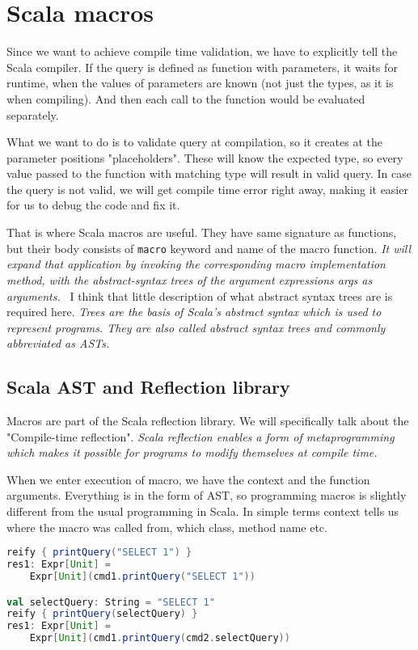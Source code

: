 \section{Scala macros}
Since we want to achieve compile time validation, we have to explicitly tell the Scala compiler. If the query is defined as function with parameters, it waits for runtime, when the values of parameters are known (not just the types, as it is when compiling). And then each call to the function would be evaluated separately.

What we want to do is to validate query at compilation, so it creates at the parameter positions "placeholders". These will know the expected type, so every value passed to the function with matching type will result in valid query. In case the query is not valid, we will get compile time error right away, making it easier for us to debug the code and fix it.

That is where Scala macros are useful. They have same signature as functions, but their body consists of \texttt{macro} keyword and name of the macro function.  \textit{It will expand that application by invoking the corresponding macro implementation method, with the abstract-syntax trees of the argument expressions args as arguments.}~\cite{Def macros} I think that little description of what abstract syntax trees are is required here. \textit{Trees are the basis of Scala’s abstract syntax which is used to represent programs. They are also called abstract syntax trees and commonly abbreviated as ASTs.}\cite{Trees}

\subsection{Scala AST and Reflection library}
Macros are part of the Scala reflection library. We will specifically talk about the "Compile-time reflection". \textit{Scala reflection enables a form of metaprogramming which makes it possible for programs to modify themselves at compile time.}\cite{Compile-time reflection} 

When we enter execution of macro, we have the context and the function arguments. Everything is in the form of AST, so programming macros is slightly different from the usual programming in Scala. In simple terms context tells us where the macro was called from, which class, method name etc. 

\newpage



\begin{lstlisting}[language=scala, basicstyle=\ttfamily, showstringspaces=false]
reify { printQuery("SELECT 1") }
res1: Expr[Unit] = 
    Expr[Unit](cmd1.printQuery("SELECT 1"))

val selectQuery: String = "SELECT 1"
reify { printQuery(selectQuery) }
res1: Expr[Unit] = 
    Expr[Unit](cmd1.printQuery(cmd2.selectQuery))
\end{lstlisting}


